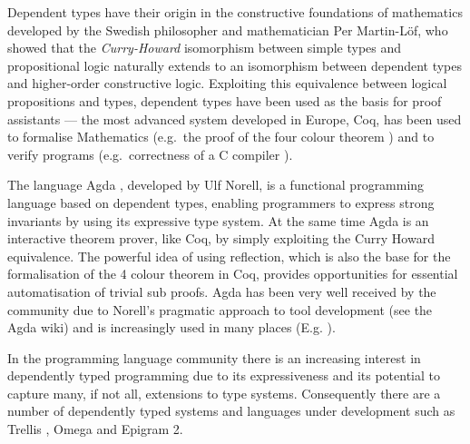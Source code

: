 \documentclass[a4paper]{article}
\begin{document}
Dependent types have their origin in the constructive foundations of
mathematics developed by the Swedish
philosopher and mathematician Per Martin-L\"of, who showed that the
\emph{Curry-Howard} isomorphism between simple types and propositional
logic naturally extends to an isomorphism between dependent types and
higher-order constructive logic.  Exploiting this equivalence between
logical propositions and types, dependent types have been used as the
basis for proof assistants --- the most advanced system developed in
Europe, Coq, has been used to formalise Mathematics (e.g.\
the proof of the four colour theorem
) and to verify programs (e.g.\
correctness of a C
compiler \citemain{compcert-back}).

The language Agda , developed by Ulf Norell, is a functional
programming language based on dependent types, enabling programmers to
express strong invariants by using its expressive type system. At the
same time Agda is an interactive theorem prover, like Coq, by simply
exploiting the Curry Howard equivalence. The powerful idea of using
reflection, which is also the base for the formalisation of the 4
colour theorem in Coq, provides opportunities for essential
automatisation of trivial sub proofs. Agda has been very well received
by the community due to Norell's pragmatic approach to tool
development (see the Agda wiki)
and is increasingly used in many places 
(E.g. \citemain{agda4}).

In the programming language community there is an increasing interest
in dependently typed programming due to its expressiveness and its
potential to capture many, if not all, extensions to type
systems. Consequently there are a number of dependently typed systems
and languages under development such as Trellis , Omega
\citemain{omega} and Epigram 2.


\end{document}
